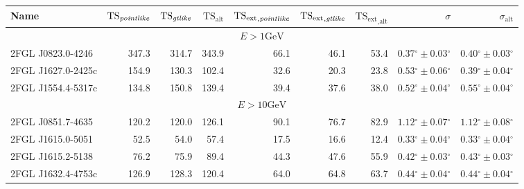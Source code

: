 \documentclass[12pt,preprint]{aastex}
\newcommand{\gev}{\text{GeV}\xspace}
\newcommand{\tsext}{{\ensuremath{\text{TS}_\text{ext}}}\xspace}
\newcommand{\tsextpointlike}{\ensuremath{\tsext_{,\pointlike}}\xspace}
\newcommand{\tsextgtlike}{\ensuremath{\tsext_{,\gtlike}}\xspace}
\newcommand{\tsextalt}{\ensuremath{\tsext_{,\alt}}\xspace}
\newcommand{\ts}{\text{TS}\xspace}
\newcommand{\alt}{\text{alt}\xspace}
\renewcommand{\deg}{\ensuremath{^\circ}\xspace}
\newcommand{\pointlike}{\text{\em pointlike}\xspace}
\newcommand{\gtlike}{\text{\em gtlike}\xspace}
\begin{document}
  \clearpage
  \begin{table}
    \begin{centering}
      \begin{tabular}{l|rrrrrrrr}
        \hline
        \hline
        Name                 &     $\ts_\pointlike$ &        $\ts_\gtlike$ &           $\ts_\alt$ &          \tsextpointlike &           \tsextgtlike &            \tsextalt &                    $\sigma$ &               $\sigma_\alt$ \\
        \hline
        \multicolumn{9}{c}{$E > 1 \gev$} \\
        \hline
        2FGL J0823.0-4246    &                347.3 &                314.7 &                343.9 &                     66.1 &                   46.1 &                 53.4 & $  0.37\deg \pm   0.03\deg$ & $  0.40\deg \pm   0.03\deg$ \\
        2FGL J1627.0-2425c   &                154.9 &                130.3 &                102.4 &                     32.6 &                   20.3 &                 23.8 & $  0.53\deg \pm   0.06\deg$ & $  0.39\deg \pm   0.04\deg$ \\
        2FGL J1554.4-5317c   &                134.8 &                150.8 &                139.4 &                     39.4 &                   37.6 &                 38.0 & $  0.52\deg \pm   0.04\deg$ & $  0.55\deg \pm   0.04\deg$ \\
        \hline
        \multicolumn{9}{c}{$E > 10 \gev$} \\
        \hline
        2FGL J0851.7-4635    &                120.2 &                120.0 &                126.1 &                     90.1 &                   76.7 &                 82.9 & $  1.12\deg \pm   0.07\deg$ & $  1.12\deg \pm   0.08\deg$ \\
        2FGL J1615.0-5051    &                 52.5 &                 54.0 &                 57.4 &                     17.5 &                   16.6 &                 12.4 & $  0.33\deg \pm   0.04\deg$ & $  0.33\deg \pm   0.04\deg$ \\
        2FGL J1615.2-5138    &                 76.2 &                 75.9 &                 89.4 &                     44.3 &                   47.6 &                 55.9 & $  0.42\deg \pm   0.03\deg$ & $  0.43\deg \pm   0.03\deg$ \\
        2FGL J1632.4-4753c   &                126.9 &                128.3 &                120.4 &                     64.0 &                   64.8 &                 63.7 & $  0.44\deg \pm   0.04\deg$ & $  0.44\deg \pm   0.04\deg$ \\

\end{tabular}
\end{centering}
\end{table}
\end{document}
